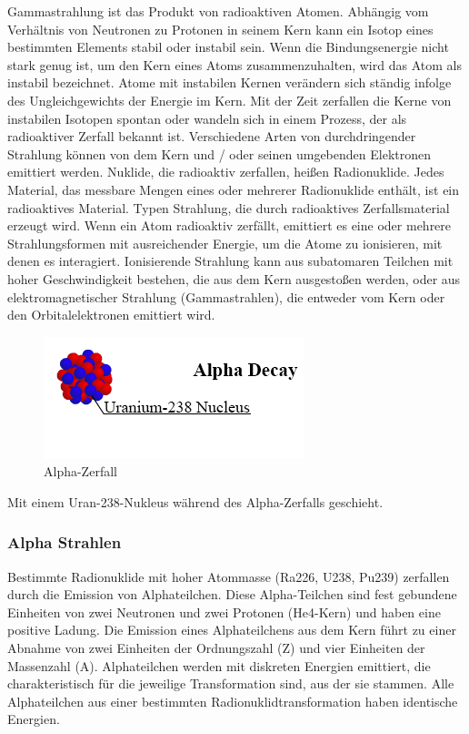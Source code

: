 Gammastrahlung ist das Produkt von radioaktiven Atomen. Abhängig vom Verhältnis von Neutronen zu Protonen in seinem Kern kann ein Isotop eines bestimmten Elements stabil oder instabil sein. Wenn die Bindungsenergie nicht stark genug ist, um den Kern eines Atoms zusammenzuhalten, wird das Atom als instabil bezeichnet. Atome mit instabilen Kernen verändern sich ständig infolge des Ungleichgewichts der Energie im Kern. Mit der Zeit zerfallen die Kerne von instabilen Isotopen spontan oder wandeln sich in einem Prozess, der als radioaktiver Zerfall bekannt ist. Verschiedene Arten von durchdringender Strahlung können von dem Kern und / oder seinen umgebenden Elektronen emittiert werden. Nuklide, die radioaktiv zerfallen, heißen Radionuklide. Jedes Material, das messbare Mengen eines oder mehrerer Radionuklide enthält, ist ein radioaktives Material.
Typen Strahlung, die durch radioaktives Zerfallsmaterial erzeugt wird.
Wenn ein Atom radioaktiv zerfällt, emittiert es eine oder mehrere Strahlungsformen mit ausreichender Energie, um die Atome zu ionisieren, mit denen es interagiert. Ionisierende Strahlung kann aus subatomaren Teilchen mit hoher Geschwindigkeit bestehen, die aus dem Kern ausgestoßen werden, oder aus elektromagnetischer Strahlung (Gammastrahlen), die entweder vom Kern oder den Orbitalelektronen emittiert wird.
\begin{figure}[htb]
  \centering  
  \includegraphics[scale=0.7]{img/uranium.png}
  \caption{Alpha-Zerfall}
  \label{fig:uranium}
\end{figure}

 Mit einem Uran-238-Nukleus während des Alpha-Zerfalls geschieht.
 \subsubsection{Alpha Strahlen}
 Bestimmte Radionuklide mit hoher Atommasse (Ra226, U238, Pu239) zerfallen durch die Emission von Alphateilchen. Diese Alpha-Teilchen sind fest gebundene Einheiten von zwei Neutronen und zwei Protonen (He4-Kern) und haben eine positive Ladung. Die Emission eines Alphateilchens aus dem Kern führt zu einer Abnahme von zwei Einheiten der Ordnungszahl (Z) und vier Einheiten der Massenzahl (A). Alphateilchen werden mit diskreten Energien emittiert, die charakteristisch für die jeweilige Transformation sind, aus der sie stammen. Alle Alphateilchen aus einer bestimmten Radionuklidtransformation haben identische Energien.
